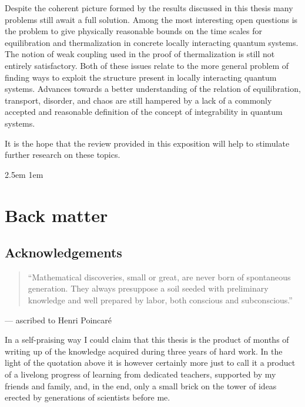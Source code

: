 \documentclass[a4paper,12pt,listof=totoc,index=totoc,bibliography=totoc,headsepline=false,headings=normal,BCOR16.153846mm,DIV12,headinclude,twoside,cleardoublepage=empty,numbers=noenddot,final]{scrreprt}
\theoremstyle{mystyle}
\numberwithin{equation}{section}
\numberwithin{figure}{section}
\numberwithin{lemma}{section}
\numberwithin{theorem}{section}
\numberwithin{corollary}{section}
\numberwithin{definition}{section}
\numberwithin{conjecture}{section}
\numberwithin{observation}{section}
\newcommand{\+}{\mkern2mu}
\DeclareMathOperator{\1}{\mathds{1}}
\begin{document}
Despite the coherent picture formed by the results discussed in this thesis many problems still await a full solution.
Among the most interesting open questions is the problem to give physically reasonable bounds on the time scales for equilibration and thermalization in concrete locally interacting quantum systems.
The notion of weak coupling used in the proof of thermalization is still not entirely satisfactory.
Both of these issues relate to the more general problem of finding ways to exploit the structure present in locally interacting quantum systems.
Advances towards a better understanding of the relation of equilibration, transport, disorder, and chaos are still hampered by a lack of a commonly accepted and reasonable definition of the concept of integrability in quantum systems.

It is the hope that the review provided in this exposition will help to stimulate further research on these topics.

\cleardoublepage

%
\emergencystretch 2.5em
\printbibliography
\emergencystretch 1em

\cleardoublepage

\appendix

\chapter{Back matter}

\section{Acknowledgements}

\begin{quotation}
  ``Mathematical discoveries, small or great, are never born of spontaneous generation. They always presuppose a soil seeded with preliminary knowledge and well prepared by labor, both conscious and subconscious.''
\end{quotation}
\begin{flushright}
  --- ascribed to Henri Poincar\'e
\end{flushright}

In a self-praising way I could claim that this thesis is the product of months of writing up of the knowledge acquired during three years of hard work.
In the light of the quotation above it is however certainly more just to call it a product of a livelong progress of learning from dedicated teachers, supported by my friends and family, and, in the end, only a small brick on the tower of ideas erected by generations of scientists before me.
\end{document}
